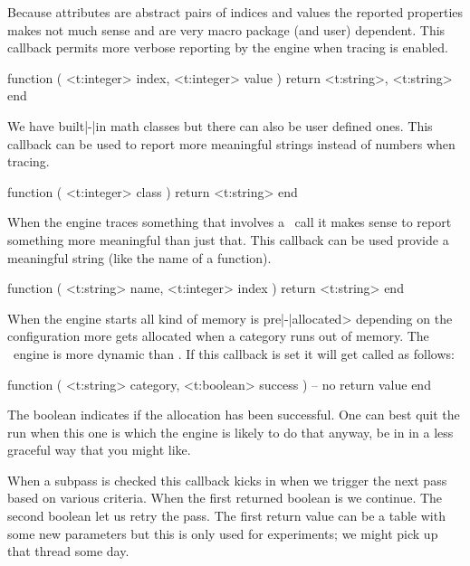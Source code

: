 Because attributes are abstract pairs of indices and values the reported
properties makes not much sense and are very macro package (and user) dependent.
This callback permits more verbose reporting by the engine when tracing is
enabled.

\starttyping[option=LUA]
function (
    <t:integer> index,
    <t:integer> value
)
    return <t:string>, <t:string>
end
\stoptyping

\stopsubsection

\startsubsection[title=get_noad_class]

We have built|-|in math classes but there can also be user defined ones. This
callback can be used to report more meaningful strings instead of numbers when
tracing.

\starttyping[option=LUA]
function (
    <t:integer> class
)
    return <t:string>
end
\stoptyping

\stopsubsection

\stopsubsection

\startsubsection[title=show_lua_call]

When the engine traces something that involves a \LUA\ call it makes sense to report something
more meaningful than just that. This callback can be used provide a meaningful string (like the
name of a function).

\starttyping[option=LUA]
function (
    <t:string>  name,
    <t:integer> index
)
    return <t:string>
end
\stoptyping

\stopsubsection

\startsubsection[title=trace_memory]

When the engine starts all kind of memory is pre|-|allocated> depending on the
configuration more gets allocated when a category runs out of memory. The
\LUAMETATEX\ engine is more dynamic than \LUATEX. If this callback is set it will
get called as follows:

\starttyping[option=LUA]
function (
    <t:string>  category,
    <t:boolean> success
)
    -- no return value
end
\stoptyping

The boolean indicates if the allocation has been successful. One can best quit
the run when this one is  which the engine is likely to do that
anyway, be in in a less graceful way that you might like.

\stopsubsection

\startsubsection[title=paragraph_pass]

When a subpass is checked this callback kicks in when we trigger the next pass
based on various criteria. When the first returned boolean is  we
continue. The second boolean let us retry the pass. The first return value can be
a table with some new parameters but this is only used for experiments; we might
pick up that thread some day.

